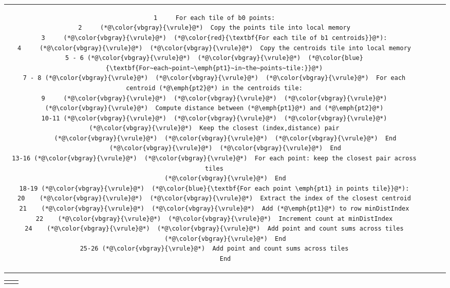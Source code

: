 \begin{tabular}{cm{}m{}m{}}
{\begin{lstlisting}[numbers=none,language=PseudoSimple]
1     For each tile of b0 points:
2     (*@\color{vbgray}{\vrule}@*)  Copy the points tile into local memory
3     (*@\color{vbgray}{\vrule}@*)  (*@\color{red}{\textbf{For each tile of b1 centroids}}@*):
4     (*@\color{vbgray}{\vrule}@*)  (*@\color{vbgray}{\vrule}@*)  Copy the centroids tile into local memory
5 - 6 (*@\color{vbgray}{\vrule}@*)  (*@\color{vbgray}{\vrule}@*)  (*@\color{blue}{\textbf{For~each~point~\emph{pt1}~in~the~points~tile:}}@*)
7 - 8 (*@\color{vbgray}{\vrule}@*)  (*@\color{vbgray}{\vrule}@*)  (*@\color{vbgray}{\vrule}@*)  For each centroid (*@\emph{pt2}@*) in the centroids tile:
9     (*@\color{vbgray}{\vrule}@*)  (*@\color{vbgray}{\vrule}@*)  (*@\color{vbgray}{\vrule}@*)  (*@\color{vbgray}{\vrule}@*)  Compute distance between (*@\emph{pt1}@*) and (*@\emph{pt2}@*)
10-11 (*@\color{vbgray}{\vrule}@*)  (*@\color{vbgray}{\vrule}@*)  (*@\color{vbgray}{\vrule}@*)  (*@\color{vbgray}{\vrule}@*)  Keep the closest (index,distance) pair
      (*@\color{vbgray}{\vrule}@*)  (*@\color{vbgray}{\vrule}@*)  (*@\color{vbgray}{\vrule}@*)  End
      (*@\color{vbgray}{\vrule}@*)  (*@\color{vbgray}{\vrule}@*)  End
13-16 (*@\color{vbgray}{\vrule}@*)  (*@\color{vbgray}{\vrule}@*)  For each point: keep the closest pair across tiles
      (*@\color{vbgray}{\vrule}@*)  End
18-19 (*@\color{vbgray}{\vrule}@*)  (*@\color{blue}{\textbf{For each point \emph{pt1} in points tile}}@*):
20    (*@\color{vbgray}{\vrule}@*)  (*@\color{vbgray}{\vrule}@*)  Extract the index of the closest centroid
21    (*@\color{vbgray}{\vrule}@*)  (*@\color{vbgray}{\vrule}@*)  Add (*@\emph{pt1}@*) to row minDistIndex
22    (*@\color{vbgray}{\vrule}@*)  (*@\color{vbgray}{\vrule}@*)  Increment count at minDistIndex
24    (*@\color{vbgray}{\vrule}@*)  (*@\color{vbgray}{\vrule}@*)  Add point and count sums across tiles
      (*@\color{vbgray}{\vrule}@*)  End
25-26 (*@\color{vbgray}{\vrule}@*)  Add point and count sums across tiles
      End
\end{lstlisting}}
\end{tabular}


\vspace{-0.2in}\begin{tabular}{cc}
{\parbox{0.45\textwidth}{}} &
{\parbox{0.5\textwidth}{}}
\end{tabular}


